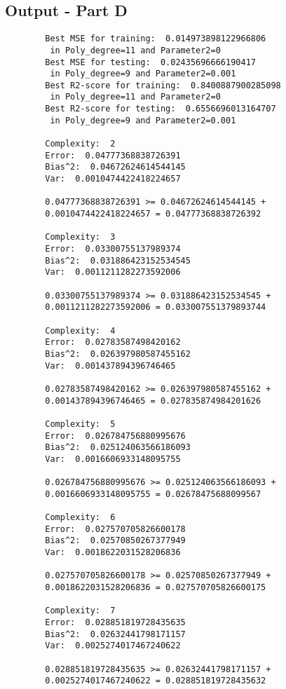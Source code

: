 \subsection{Output - Part D}
\label{chap:Output - Part D}
\begin{verbatim}
        Best MSE for training:  0.014973898122966806 
         in Poly_degree=11 and Parameter2=0
        Best MSE for testing:  0.02435696666190417 
         in Poly_degree=9 and Parameter2=0.001
        Best R2-score for training:  0.8400887900285098 
         in Poly_degree=11 and Parameter2=0
        Best R2-score for testing:  0.6556696013164707 
         in Poly_degree=9 and Parameter2=0.001
         
        Complexity:  2
        Error:  0.04777368838726391
        Bias^2:  0.04672624614544145
        Var:  0.0010474422418224657
        
        0.04777368838726391 >= 0.04672624614544145 + 
        0.0010474422418224657 = 0.04777368838726392
        
        Complexity:  3
        Error:  0.03300755137989374
        Bias^2:  0.031886423152534545
        Var:  0.0011211282273592006
        
        0.03300755137989374 >= 0.031886423152534545 +
        0.0011211282273592006 = 0.033007551379893744
        
        Complexity:  4
        Error:  0.02783587498420162
        Bias^2:  0.026397980587455162
        Var:  0.001437894396746465
        
        0.02783587498420162 >= 0.026397980587455162 + 
        0.001437894396746465 = 0.027835874984201626
        
        Complexity:  5
        Error:  0.026784756880995676
        Bias^2:  0.025124063566186093
        Var:  0.0016606933148095755
        
        0.026784756880995676 >= 0.025124063566186093 +
        0.0016606933148095755 = 0.02678475688099567
        
        Complexity:  6
        Error:  0.027570705826600178
        Bias^2:  0.02570850267377949
        Var:  0.0018622031528206836
        
        0.027570705826600178 >= 0.02570850267377949 +
        0.0018622031528206836 = 0.027570705826600175
        
        Complexity:  7
        Error:  0.028851819728435635
        Bias^2:  0.02632441798171157
        Var:  0.0025274017467240622
        
        0.028851819728435635 >= 0.02632441798171157 +
        0.0025274017467240622 = 0.028851819728435632
        

\end{verbatim}
